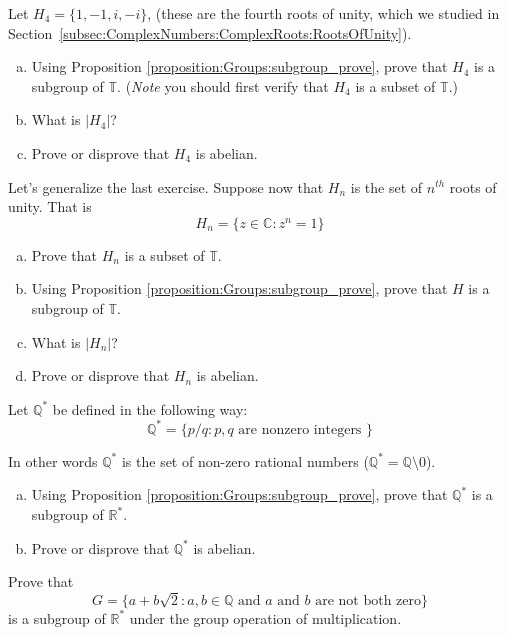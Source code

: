 \begin{exercise}{67}
Let  $H_4 = \{ 1, -1, i, -i \}$, (these are the  fourth roots of unity, which we studied in Section~\ref{subsec:ComplexNumbers:ComplexRoots:RootsOfUnity}).  
\begin{enumerate}[(a)]
\item
Using Proposition \ref{proposition:Groups:subgroup_prove}, prove that $H_4$ is a subgroup of ${\mathbb T}$. (\emph{Note} you should first verify that $H_4$ is a subset of ${\mathbb T}$.)
\item  
What is $| H_4 |$?
\item
Prove or disprove that $H_4$ is abelian.
\end{enumerate}
\end{exercise}

\begin{exercise}{68}
Let's generalize the last exercise.  Suppose now that $H_n$ is the set of \emph{$n^{th}$} roots of unity.  That is 
\[
H_n = \{z \in {\mathbb C} : z^n = 1\} \]

\begin{enumerate}[(a)]
\item
Prove that $H_n$ is a subset of ${\mathbb T}$.
\item
Using Proposition \ref{proposition:Groups:subgroup_prove}, prove that $H$ is a subgroup of ${\mathbb T}$.
\item  
What is $| H_n |$?
\item
Prove or disprove that $H_n$ is abelian.
\end{enumerate}
\end{exercise}

\begin{exercise}{69}
Let ${\mathbb Q}^*\label{noteQstar}$ be defined in the following way:
\[
{\mathbb Q}^* = \{ p/q : p, q \mbox{ are nonzero integers } \}
\]

In other words ${\mathbb Q}^*$ is the set of non-zero rational numbers (${\mathbb Q}^* = {\mathbb Q} \setminus 0$).

\begin{enumerate}[(a)]
\item
Using Proposition \ref{proposition:Groups:subgroup_prove}, prove that ${\mathbb Q}^*$ is a subgroup of ${\mathbb R}^*$.
\item
Prove or disprove that ${\mathbb Q}^*$ is abelian.
\end{enumerate}
\end{exercise}


\begin{exercise}{}
Prove that
\[
G =
\{ a + b \sqrt{2} : \mbox{$a, b \in {\mathbb
Q}$ and $a$ and $b$ are not both zero}  \}
\]
is a subgroup of ${\mathbb R}^{\ast}$ under the group operation of
multiplication. 
\end{exercise} 

